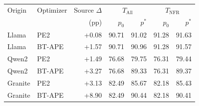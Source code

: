 \begin{tabular}{llrrrrr}
\toprule
Origin & Optimizer & Source $\Delta$ & \multicolumn{2}{c}{$T_{\mathrm{All}}$} & \multicolumn{2}{c}{$T_{\mathrm{NFR}}$} \\
 & & (pp) & $p_0$ & $p^*$ & $p_0$ & $p^*$ \\
\midrule
Llama & PE2 & +0.08 & 90.71 & 91.02 & 91.28 & 91.63 \\
Llama & BT-APE & +1.57 & 90.71 & 90.96 & 91.28 & 91.57 \\
Qwen2 & PE2 & +1.49 & 76.68 & 79.75 & 76.31 & 79.44 \\
Qwen2 & BT-APE & +3.27 & 76.68 & 89.33 & 76.31 & 89.37 \\
Granite & PE2 & +3.13 & 82.49 & 85.67 & 82.18 & 85.43 \\
Granite & BT-APE & +8.90 & 82.49 & 90.44 & 82.18 & 90.41 \\
\bottomrule
\end{tabular}
